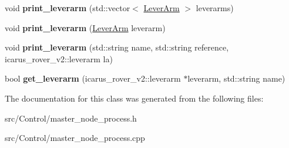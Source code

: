 \begin{DoxyCompactItemize}
void {\bfseries print\+\_\+leverarm} (std\+::vector$<$ \hyperlink{structMasterNodeProcess_1_1LeverArm}{Lever\+Arm} $>$ leverarms)
\item 
\mbox{\label{classMasterNodeProcess_ad13dfb1d049b4d02ed38b5c48710fc28}} 
void {\bfseries print\+\_\+leverarm} (\hyperlink{structMasterNodeProcess_1_1LeverArm}{Lever\+Arm} leverarm)
\item 
\mbox{\label{classMasterNodeProcess_a7b46ef5eaf19b530dff481ae98191041}} 
void {\bfseries print\+\_\+leverarm} (std\+::string name, std\+::string reference, icarus\+\_\+rover\+\_\+v2\+::leverarm la)
\item 
\mbox{\label{classMasterNodeProcess_a84aebd9354d2dd9f5a4698ed82a1fb4f}} 
bool {\bfseries get\+\_\+leverarm} (icarus\+\_\+rover\+\_\+v2\+::leverarm $\ast$leverarm, std\+::string name)
\end{DoxyCompactItemize}


The documentation for this class was generated from the following files\+:\begin{DoxyCompactItemize}
\item 
src/\+Control/master\+\_\+node\+\_\+process.\+h\item 
src/\+Control/master\+\_\+node\+\_\+process.\+cpp\end{DoxyCompactItemize}
